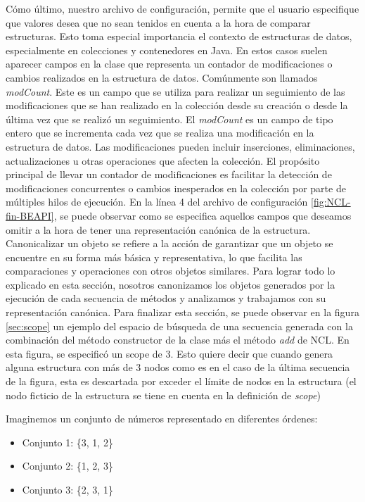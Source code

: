Cómo último, nuestro archivo de configuración, permite que el usuario especifique que valores desea que no sean tenidos en cuenta a la hora de comparar estructuras. 
Esto toma especial importancia el contexto de estructuras de datos, especialmente en colecciones y contenedores en Java. En estos casos suelen aparecer campos en la clase que representa un contador de modificaciones o cambios realizados en la estructura de datos. Comúnmente son llamados \emph{modCount}. Este es un campo que se utiliza para realizar un seguimiento de las modificaciones que se han realizado en la colección desde su creación o desde la última vez que se realizó un seguimiento. El \emph{modCount} es un campo de tipo entero que se incrementa cada vez que se realiza una modificación en la estructura de datos. Las modificaciones pueden incluir inserciones, eliminaciones, actualizaciones u otras operaciones que afecten la colección. El propósito principal de llevar un contador de modificaciones es facilitar la detección de modificaciones concurrentes o cambios inesperados en la colección por parte de múltiples hilos de ejecución. En la línea 4 del archivo de configuración \ref{fig:NCL-fin-BEAPI}, se puede observar como se especifica aquellos campos que deseamos omitir a la hora de tener una representación canónica de la estructura. Canonicalizar un objeto se refiere a la acción de garantizar que un objeto se encuentre en su forma más básica y representativa, lo que facilita las comparaciones y operaciones con otros objetos similares.
Para lograr todo lo explicado en esta sección, nosotros canonizamos los objetos generados por la ejecución de cada secuencia de métodos y analizamos y trabajamos con su representación canónica.
Para finalizar esta sección, se puede observar en la figura \ref{sec:scope} un ejemplo del espacio de búsqueda de una secuencia generada con la combinación del método constructor de la clase más el método \emph{add} de NCL. En esta figura, se especificó un scope de 3. Esto quiere decir que cuando genera alguna estructura con más de 3 nodos como es en el caso de la última secuencia de la figura, esta es descartada por exceder el límite de nodos en la estructura (el nodo ficticio de la estructura se tiene en cuenta en la definición de \emph{scope})

Imaginemos un conjunto de números representado en diferentes órdenes:
\begin{itemize}
    \item Conjunto 1: \{3, 1, 2\}
    \item Conjunto 2: \{1, 2, 3\}
    \item Conjunto 3: \{2, 3, 1\}
\end{itemize}

